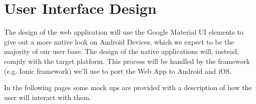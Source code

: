 \section{User Interface Design}

The design of the web application will use the Google Material UI elements to give out a more native look on
Android Devices, which we expect to be the majority of our user base.
The design of the native applications will, instead, comply with the target platform. This process will be handled
by the framework (e.g. Ionic framework) we'll use to port the Web App to Android and iOS.

In the following pages some mock ups are provided with a description of how the user will interact with them.
\newpage





